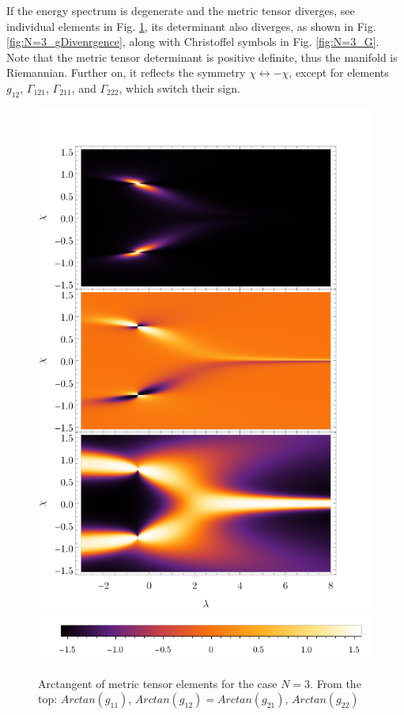 If the energy spectrum is degenerate and the metric tensor diverges, see individual elements in Fig. \ref{fig:N=3_g}, its determinant also diverges, as shown in Fig. \ref{fig:N=3_gDivenrgence}, along with Christoffel symbols in Fig. \ref{fig:N=3_G}. Note that the metric tensor determinant is positive definite, thus the manifold is Riemannian. Further on, it reflects the symmetry $\chi\leftrightarrow-\chi$, except for elements $g_{12}$, $\Gamma_{121}$, $\Gamma_{211}$, and $\Gamma_{222}$, which switch their sign.
\begin{figure}[H]
    \centering
    \includegraphics[scale=1.3]{../img/N=3_gComponents.pdf}
    \includegraphics[scale=1.3]{../img/N=3_barA.pdf}
    \caption{Arctangent of metric tensor elements for the case $N=3$. From the top: $Arctan(g_{11})$, $Arctan(g_{12})=Arctan(g_{21})$, $Arctan(g_{22})$}
    \label{fig:N=3_g}
\end{figure}


